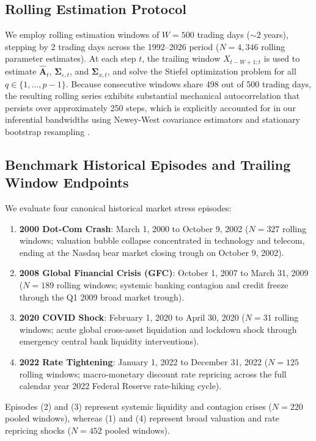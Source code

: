 \documentclass[review,12pt,authoryear]{elsarticle}
\begin{document}
\subsection{Rolling Estimation Protocol}
We employ rolling estimation windows of $W = 500$ trading days ($\sim 2$ years), stepping by 2 trading days across the 1992--2026 period ($N = 4,346$ rolling parameter estimates). At each step $t$, the trailing window $X_{t-W+1:t}$ is used to estimate $\hat{\mathbf{A}}_t$, $\boldsymbol{\Sigma}_{\varepsilon,t}$, and $\boldsymbol{\Sigma}_{x,t}$, and solve the Stiefel optimization problem for all $q \in \{1, \dots, p-1\}$. Because consecutive windows share 498 out of 500 trading days, the resulting rolling series exhibits substantial mechanical autocorrelation that persists over approximately 250 steps, which is explicitly accounted for in our inferential bandwidths using Newey-West \citep{newey1987hypothesis} covariance estimators and stationary bootstrap resampling \citep{politis1994stationary}.

\subsection{Benchmark Historical Episodes and Trailing Window Endpoints}
We evaluate four canonical historical market stress episodes:
\begin{enumerate}
    \item \textbf{2000 Dot-Com Crash}: March 1, 2000 to October 9, 2002 ($N = 327$ rolling windows; valuation bubble collapse concentrated in technology and telecom, ending at the Nasdaq bear market closing trough on October 9, 2002).
    \item \textbf{2008 Global Financial Crisis (GFC)}: October 1, 2007 to March 31, 2009 ($N = 189$ rolling windows; systemic banking contagion and credit freeze through the Q1 2009 broad market trough).
    \item \textbf{2020 COVID Shock}: February 1, 2020 to April 30, 2020 ($N = 31$ rolling windows; acute global cross-asset liquidation and lockdown shock through emergency central bank liquidity interventions).
    \item \textbf{2022 Rate Tightening}: January 1, 2022 to December 31, 2022 ($N = 125$ rolling windows; macro-monetary discount rate repricing across the full calendar year 2022 Federal Reserve rate-hiking cycle).
\end{enumerate}
Episodes (2) and (3) represent systemic liquidity and contagion crises ($N = 220$ pooled windows), whereas (1) and (4) represent broad valuation and rate repricing shocks ($N = 452$ pooled windows).
\end{document}

